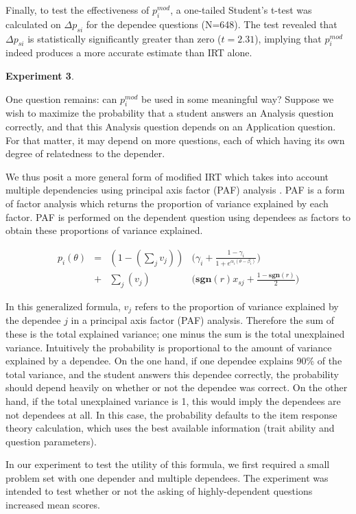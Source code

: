 \documentclass[a4paper,twocolumn]{article}
\begin{document}
Finally, to test the effectiveness of $p_i^{mod}$, a one-tailed Student's
t-test was calculated on $\Delta p_{si}$ for the dependee questions (N=648).
The test revealed that $\Delta p_{si}$ is statistically significantly greater
than zero ($t=2.31$), implying that $p_i^{mod}$ indeed produces a more accurate
estimate than IRT alone. 


\textbf{Experiment 3}. 

One question remains: can $p_i^{mod}$ be used in some meaningful way?  Suppose
we wish to maximize the probability that a student answers an Analysis question
correctly, and that this Analysis question depends on an Application question.  
For that matter, it may depend on more questions, each of which having its own
degree of relatedness to the depender.

We thus posit a more general form of modified IRT which takes into account
multiple dependencies using principal axis factor (PAF) analysis
\cite{kim1978}.  PAF is a form of factor analysis which returns the proportion
of variance explained by each factor.  PAF is performed on the dependent
question using dependees as factors to obtain these proportions of variance
explained.

\begin{align*}
  p_i(\theta) &=& (1- (\displaystyle\sum_j v_j)) & \Big(\gamma_i + \frac{1-\gamma_i}{1+e^{\alpha_i(\theta-\beta_i)}}\Big) \\
              &+& \displaystyle\sum_j (v_j)   & \Big(\mathbf{sgn}(r)x_{sj}+\frac{1-\mathbf{sgn}(r)}{2}\Big)
\end{align*}

In this generalized formula, $v_j$ refers to the proportion of variance
explained by the dependee $j$ in a principal axis factor (PAF) analysis.
Therefore the sum of these is the total explained variance; one minus the sum
is the total unexplained variance.  Intuitively the probability is proportional
to the amount of variance explained by a dependee.  On the one hand, if one
dependee explains 90\% of the total variance, and the student answers this
dependee correctly, the probability should depend heavily on whether or not the
dependee was correct.  On the other hand, if the total unexplained variance is
1, this would imply the dependees are not dependees at all.  In this case, the
probability defaults to the item response theory calculation, which uses the
best available information (trait ability and question parameters).

In our experiment to test the utility of this formula, we first required a
small problem set with one depender and multiple dependees.  The experiment
was intended to test whether or not the asking of highly-dependent questions
increased mean scores.
\end{document}
